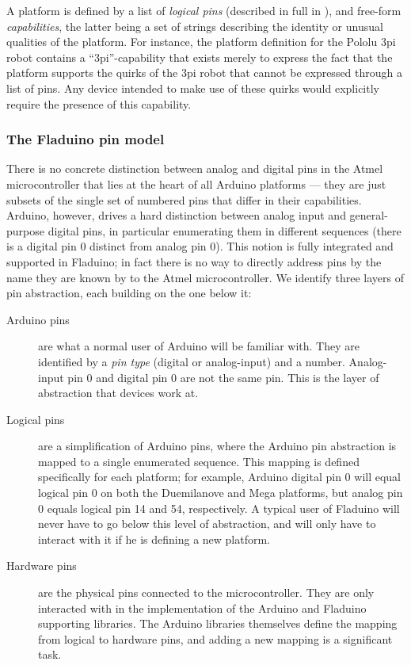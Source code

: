 \documentclass[a4paper, oneside, final]{memoir}
\let\Fref\undefined
\begin{document}
A platform is defined by a list of \textit{logical pins} (described in
full in \Fref{sec:pins}), and free-form \textit{capabilities}, the
latter being a set of strings describing the identity or unusual
qualities of the platform.  For instance, the platform definition for
the Pololu 3pi robot contains a ``3pi''-capability that exists merely
to express the fact that the platform supports the quirks of the 3pi
robot that cannot be expressed through a list of pins.  Any device
intended to make use of these quirks would explicitly require the
presence of this capability.

\subsubsection{The Fladuino pin model}
\label{sec:pins}
There is no concrete distinction between analog and digital pins in
the Atmel microcontroller that lies at the heart of all Arduino
platforms --- they are just subsets of the single set of numbered pins
that differ in their capabilities.  Arduino, however, drives a hard
distinction between analog input and general-purpose digital pins, in
particular enumerating them in different sequences (there is a digital
pin 0 distinct from analog pin 0).  This notion is fully integrated
and supported in Fladuino; in fact there is no way to directly address
pins by the name they are known by to the Atmel microcontroller.  We
identify three layers of pin abstraction, each building on the one
below it:

\begin{description}
\item[Arduino pins] are what a normal user of Arduino will be familiar
  with.  They are identified by a \textit{pin type} (digital or
  analog-input) and a number.  Analog-input pin 0 and digital pin 0
  are not the same pin.  This is the layer of abstraction that devices
  work at.
\item[Logical pins] are a simplification of Arduino pins, where the
  Arduino pin abstraction is mapped to a single enumerated sequence.
  This mapping is defined specifically for each platform; for example,
  Arduino digital pin 0 will equal logical pin 0 on both the
  Duemilanove and Mega platforms, but analog pin 0 equals logical pin
  14 and 54, respectively.  A typical user of Fladuino will never have
  to go below this level of abstraction, and will only have to
  interact with it if he is defining a new platform.
\item[Hardware pins] are the physical pins connected to the
  microcontroller.  They are only interacted with in the
  implementation of the Arduino and Fladuino supporting libraries.
  The Arduino libraries themselves define the mapping from logical to
  hardware pins, and adding a new mapping is a significant task.
\end{description}
\end{document}
